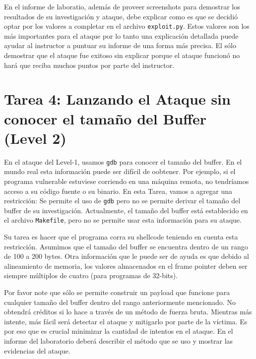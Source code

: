 En el informe de laboratio, además de proveer screenshots para demostrar los resultados de su investigación y ataque, debe explicar como es que se decidió optar por los valores a completar en el archivo \texttt{exploit.py}. Estos valores son los más importantes para el ataque por lo tanto una explicación detallada puede ayudar al instructor a puntuar su informe de una forma más precisa. El sólo demostrar que el ataque fue exitoso sin explicar porque el ataque funcionó no hará que reciba muchos puntos por parte del instructor.


\section{Tarea 4: Lanzando el Ataque sin conocer el tamaño del Buffer (Level 2)}

En el ataque del Level-1, usamos \texttt{gdb} para conocer el tamaño del buffer. En el mundo real esta información puede ser difícil de oobtener. Por ejemplo, si el programa vulnerable estuviese corriendo en una máquina remota, no tendríamos acceso a su código fuente o su binario. En esta Tarea, vamos a agregar una restricción: Se permite el uso de \texttt{gdb} pero no se permite derivar el tamaño del buffer de su investigación. Actualmente, el tamaño del buffer está establecido en el archivo \texttt{Makefile}, pero no se permite usar esta información para su ataque.

Su tarea es hacer que el programa corra su shellcode teniendo en cuenta esta restricción. Asumimos que el tamaño del buffer se encuentra dentro de un rango de 100 a 200 bytes. Otra información que le puede ser de ayuda es que debido al alineamiento de memoria, los valores almacenados en el frame pointer deben ser siempre múltiplos de cuatro (para programas de 32-bits).

Por favor note que sólo se permite construir un payload que funcione para cualquier tamaño del buffer dentro del rango anteriormente mencionado. No obtendrá créditos si lo hace a través de un método de fuerza bruta. Mientras más intente, más fácil será detectar el ataque y mitigarlo por parte de la víctima. Es por eso que es crucial minimizar la cantidad de intentos en el ataque.
En el informe del laboratorio deberá describir el método que se uso y mostrar las evidencias del ataque.


